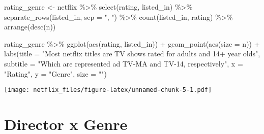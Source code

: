 \documentclass[
]{article}
\newenvironment{Shaded}{\begin{snugshade}}{\end{snugshade}}
\newcommand{\AttributeTok}[1]{\textcolor[rgb]{0.77,0.63,0.00}{#1}}
\newcommand{\FunctionTok}[1]{\textcolor[rgb]{0.00,0.00,0.00}{#1}}
\newcommand{\NormalTok}[1]{#1}
\newcommand{\OtherTok}[1]{\textcolor[rgb]{0.56,0.35,0.01}{#1}}
\newcommand{\SpecialCharTok}[1]{\textcolor[rgb]{0.00,0.00,0.00}{#1}}
\newcommand{\StringTok}[1]{\textcolor[rgb]{0.31,0.60,0.02}{#1}}
\begin{document}
\begin{Shaded}
\begin{Highlighting}[]
\NormalTok{rating\_genre }\OtherTok{\textless{}{-}}\NormalTok{ netflix }\SpecialCharTok{\%\textgreater{}\%} 
  \FunctionTok{select}\NormalTok{(rating, listed\_in) }\SpecialCharTok{\%\textgreater{}\%} 
  \FunctionTok{separate\_rows}\NormalTok{(listed\_in, }\AttributeTok{sep =} \StringTok{", "}\NormalTok{) }\SpecialCharTok{\%\textgreater{}\%} 
  \FunctionTok{count}\NormalTok{(listed\_in, rating) }\SpecialCharTok{\%\textgreater{}\%} 
  \FunctionTok{arrange}\NormalTok{(}\FunctionTok{desc}\NormalTok{(n))}
  

\NormalTok{rating\_genre }\SpecialCharTok{\%\textgreater{}\%} 
  \FunctionTok{ggplot}\NormalTok{(}\FunctionTok{aes}\NormalTok{(rating, listed\_in)) }\SpecialCharTok{+}
  \FunctionTok{geom\_point}\NormalTok{(}\FunctionTok{aes}\NormalTok{(}\AttributeTok{size =}\NormalTok{ n)) }\SpecialCharTok{+}
  \FunctionTok{labs}\NormalTok{(}\AttributeTok{title =} \StringTok{"Most netflix titles are TV shows rated for adults and 14+ year olds"}\NormalTok{,}
       \AttributeTok{subtitle =} \StringTok{"Which are represented ad TV{-}MA and TV{-}14, respectively"}\NormalTok{,}
       \AttributeTok{x =} \StringTok{"Rating"}\NormalTok{, }\AttributeTok{y =} \StringTok{"Genre"}\NormalTok{, }\AttributeTok{size =} \StringTok{""}\NormalTok{)}
\end{Highlighting}
\end{Shaded}

\texttt{[image: netflix\_files/figure-latex/unnamed-chunk-5-1.pdf]}

\hypertarget{director-x-genre}{%
\section{Director x Genre}\label{director-x-genre}}
\end{document}
